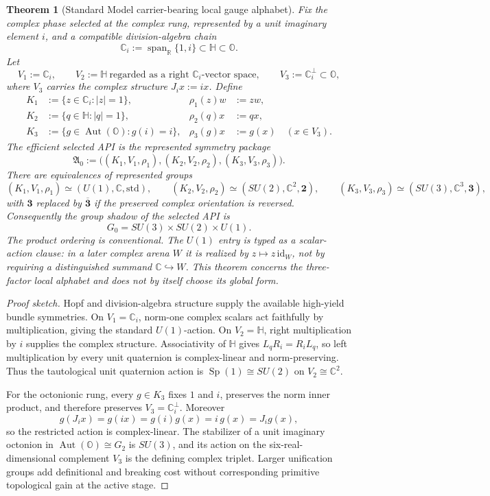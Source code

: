\documentclass[11pt]{article}
\theoremstyle{plain}
\newtheorem{theorem}{Theorem}[section]
\theoremstyle{definition}
\theoremstyle{remark}
\newenvironment{proofsketch}{\begin{proof}[Proof sketch]}{\end{proof}}
\newcommand{\Aut}{\operatorname{Aut}}
\newcommand{\R}{\mathbb{R}}
\newcommand{\C}{\mathbb{C}}
\newcommand{\HH}{\mathbb{H}}
\newcommand{\OO}{\mathbb{O}}
\begin{document}
\begin{theorem}[Standard Model carrier-bearing local gauge alphabet]
Fix the complex phase selected at the complex rung, represented by a unit
imaginary element \(i\), and a compatible division-algebra chain
\[
\C_i:=\operatorname{span}_{\R}\{1,i\}\subset\HH\subset\OO.
\]
Let
\[
V_1:=\C_i,
\qquad
V_2:=\HH\ \text{regarded as a right }\C_i\text{-vector space},
\qquad
V_3:=\C_i^\perp\subset\OO,
\]
where \(V_3\) carries the complex structure \(J_i x:=ix\).  Define
\[
\begin{aligned}
K_1&:=\{z\in\C_i:|z|=1\},
&\rho_1(z)w&:=zw,\\
K_2&:=\{q\in\HH:|q|=1\},
&\rho_2(q)x&:=qx,\\
K_3&:=\{g\in\Aut(\OO):g(i)=i\},
&\rho_3(g)x&:=g(x)\quad(x\in V_3).
\end{aligned}
\]
The efficient selected API is the represented symmetry package
\[
\mathfrak A_0
:=
\bigl((K_1,V_1,\rho_1),(K_2,V_2,\rho_2),(K_3,V_3,\rho_3)\bigr).
\]
There are equivalences of represented groups
\[
(K_1,V_1,\rho_1)\simeq(U(1),\C,\mathrm{std}),
\qquad
(K_2,V_2,\rho_2)\simeq(SU(2),\C^2,\mathbf{2}),
\qquad
(K_3,V_3,\rho_3)\simeq(SU(3),\C^3,\mathbf{3}),
\]
with \(\mathbf{3}\) replaced by \(\overline{\mathbf{3}}\) if the preserved
complex orientation is reversed.  Consequently the group shadow of the
selected API is
\[
G_0=SU(3)\times SU(2)\times U(1).
\]
The product ordering is conventional.  The \(U(1)\) entry is typed as a
scalar-action clause: in a later complex arena \(W\) it is realized by
\(z\mapsto z\,\mathrm{id}_W\), not by requiring a distinguished summand
\(\C\hookrightarrow W\).  This theorem concerns the three-factor local
alphabet and does not by itself choose its global form.
\end{theorem}

\begin{proofsketch}
Hopf and division-algebra structure supply the available high-yield bundle
symmetries.  On \(V_1=\C_i\), norm-one complex scalars act faithfully by
multiplication, giving the standard \(U(1)\)-action.  On \(V_2=\HH\), right
multiplication by \(i\) supplies the complex structure.  Associativity of
\(\HH\) gives \(L_qR_i=R_iL_q\), so left multiplication by every unit
quaternion is complex-linear and norm-preserving.  Thus the tautological unit
quaternion action is \(\operatorname{Sp}(1)\cong SU(2)\) on
\(V_2\cong\C^2\).

For the octonionic rung, every \(g\in K_3\) fixes \(1\) and \(i\), preserves
the norm inner product, and therefore preserves
\(V_3=\C_i^\perp\).  Moreover
\[
g(J_i x)=g(ix)=g(i)g(x)=i\,g(x)=J_i g(x),
\]
so the restricted action is complex-linear.  The stabilizer of a unit
imaginary octonion in \(\Aut(\OO)\cong G_2\) is \(SU(3)\), and its action on
the six-real-dimensional complement \(V_3\) is the defining complex triplet.
Larger unification groups add definitional and breaking cost without
corresponding primitive topological gain at the active stage.
\end{proofsketch}
\end{document}
